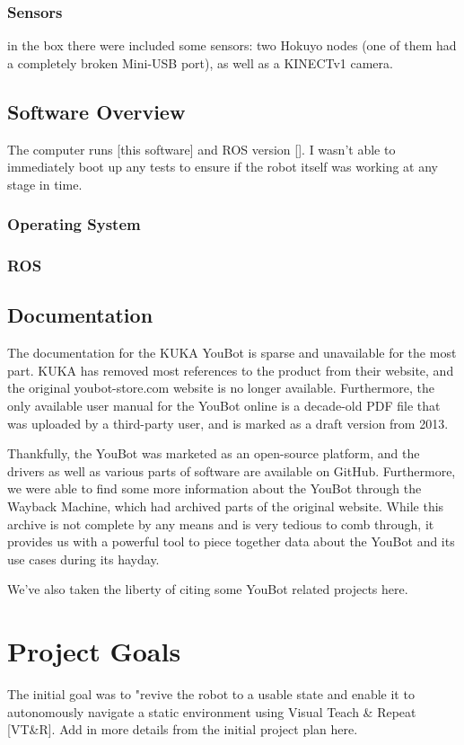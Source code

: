 \documentclass[a4paper, 12pt]{article}
\begin{document}
    \subsubsection{Sensors}
    in the box there were included some sensors: two Hokuyo nodes (one of them had a completely broken Mini-USB port), as well as a KINECTv1 camera. 

    \subsection{Software Overview}
    The computer runs [this software] and ROS version []. I wasn't able to immediately boot up any tests to ensure if the robot itself was working at any stage in time. 

    \subsubsection{Operating System}
    \subsubsection{ROS}

    \subsection{Documentation}

    The documentation for the KUKA YouBot is sparse and unavailable for the most part. KUKA has removed most references to the product from their website, and the original youbot-store.com website is no longer available. Furthermore, the only available user manual for the YouBot online is a decade-old PDF file that was uploaded by a third-party user, and is marked as a draft version from 2013. 

    Thankfully, the YouBot was marketed as an open-source platform, and the drivers as well as various parts of software are available on GitHub. Furthermore, we were able to find some more information about the YouBot through the Wayback Machine, which had archived parts of the original website. While this archive is not complete by any means and is very tedious to comb through, it provides us with a powerful tool to piece together data about the YouBot and its use cases during its hayday.

    We've also taken the liberty of citing some YouBot related projects here.

    \pagebreak
    
    \section{Project Goals}
    The initial goal was to "revive the robot to a usable state and enable it to autonomously navigate a static environment using Visual Teach \& Repeat [VT\&R]. Add in more details from the initial project plan here. 
\end{document}
